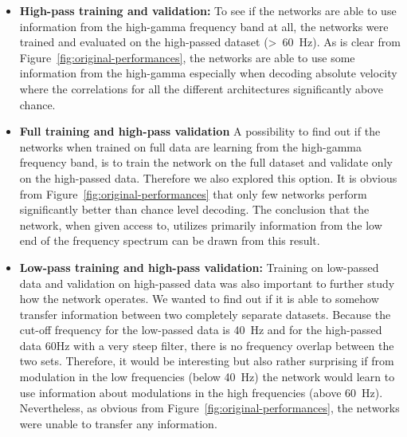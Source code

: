 \begin{itemize}
    \item \textbf{High-pass training and validation:} To see if the networks are able to use information from the high-gamma frequency band at all, the networks were trained and evaluated on the high-passed dataset (>~60~Hz).
    As is clear from Figure~\ref{fig:original-performances}, the networks are able to use some information from the high-gamma especially when decoding absolute velocity where the correlations for all the different architectures significantly above chance.
    \item \textbf{Full training and high-pass validation} A possibility to find out if the networks when trained on full data are learning from the high-gamma frequency band, is to train the network on the full dataset and validate only on the high-passed data.
    Therefore we also explored this option.
    It is obvious from Figure~\ref{fig:original-performances} that only few networks perform significantly better than chance level decoding.
    The conclusion that the network, when given access to, utilizes primarily information from the low end of the frequency spectrum can be drawn from this result.
    \item \textbf{Low-pass training and high-pass validation:}
    Training on low-passed data and validation on high-passed data was also important to further study how the network operates.
    We wanted to find out if it is able to somehow transfer information between two completely separate datasets.
    Because the cut-off frequency for the low-passed data is 40~Hz and for the high-passed data 60Hz with a very steep filter, there is no frequency overlap between the two sets.
    Therefore, it would be interesting but also rather surprising if from modulation in the low frequencies (below 40~Hz) the network would learn to use information about modulations in the high frequencies (above 60~Hz).
    Nevertheless, as obvious from Figure~\ref{fig:original-performances}, the networks were unable to transfer any information.
    

\end{itemize}
